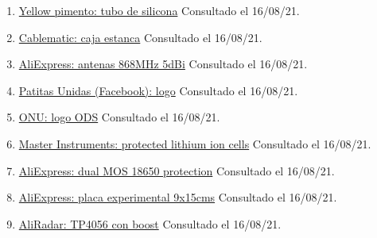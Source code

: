 \documentclass[12pt]{article}
\begin{document}
\begin{enumerate}
				\item 
				\label{bib: yellow pimento}
				\href{https://yellowpimento.com/Para-compresores-de-aire/vdvgx-504009/12mm-OD-ft-m-Tubo-flexible-de-caucho-de-silicona-Tubo-de-manguera-de.htm}{Yellow pimento: tubo de silicona} Consultado el 16/08/21.
				
				\item 
				\label{bib: cablematic}
				\href{https://cablematic.com/es/productos/caja-estanca-de-superficie-rectangular-ip55-200-x-155-x-80-mm-AE006/}{Cablematic: caja estanca} Consultado el 16/08/21.
				
				\item 
				\label{bib: AliExpress}
				\href{https://es.aliexpress.com/item/32972870968.html?spm=a2g0s.9042311.0.0.274263c0xMPROA}{AliExpress: antenas 868MHz 5dBi}	Consultado el 16/08/21.			
				
				\item 
				\label{bib: patitas logo}
				\href{https://www.facebook.com/patitasunidaslosalcazares/photos/a.1390104817919443/1979671835629402/?type=1\&theater}{Patitas Unidas (Facebook): logo} Consultado el 16/08/21.
				
				\item 
				\label{bib: ods logo}
				\href{https://www.un.org/sustainabledevelopment/es/}{ONU: logo ODS} Consultado el 16/08/21.
				
				\item 
				\label{bib: protected li-ion cells}
				\href{https://www.master-instruments.com.au/news-article/119/Protected\%20Lithium\%20Ion\%20Cells.html}{Master Instruments: protected lithium ion cells} Consultado el 16/08/21.
				
				
				\item 
				\label{bib: aliexpress dual mos}
				\href{https://es.aliexpress.com/i/32985307442.html}{AliExpress: dual MOS 18650 protection} Consultado el 16/08/21.
				
				\item 
				\label{bib: aliexpress placa exp}
				\href{https://es.aliexpress.com/item/32752226972.html}{AliExpress: placa experimental 9x15cms} Consultado el 16/08/21.
				
				\item 
				\label{bib: aliradar tp4056 con boost}
				\href{https://en.aliradar.com/item/4001246163578-lithium-li-ion-18650-3.7v-4.2v-9v-5v-2a-battery-charger-board-adjustable-dc-dc-step-up-boost-module-tp4056}{AliRadar: TP4056 con boost} Consultado el 16/08/21.
				

\end{enumerate}
\end{document}
